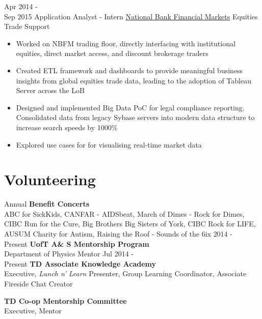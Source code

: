 \documentclass[letterpaper]{twentysecondcv} %
\begin{document}
\begin{twenty}
     \twentyitem
   		{Apr 2014 - \\ Sep 2015}
        {Application Analyst - Intern}
        {\href{http://nbfm.ca/}{National Bank Financial Markets}}
        {Equities Trade Support}
        {
        \begin{itemize}
		\item Worked on NBFM trading floor, directly interfacing with institutional equities, direct market access, and discount brokerage traders
        \item Created ETL framework and  dashboards to provide meaningful business insights from global equities trade data, leading to the adoption of Tableau Server across the LoB
        \item Designed and implemented  Big Data PoC for legal compliance reporting. Consolidated data from legacy Sybase servers into modern data structure to increase search speeds by 1000\% 
        \item Explored use cases for  for visualising real-time market data
	    \end{itemize}
    	}
        
\end{twenty}

\vfill
\section{Volunteering}
\begin{twentyshort}
\twentyitemshort
		{Annual}
		{\textbf{Benefit Concerts} \\ ABC for SickKids, CANFAR - AIDSbeat, March of Dimes - Rock for Dimes, CIBC Run for the Cure, Big Brothers Big Sisters of York, CIBC Rock for LIFE, AUSUM Charity for Autism, Raising the Roof - Sounds of the 6ix}
\twentyitemshort
   		{2014 - \\ Present}
        {\textbf{UofT A\& S Mentorship Program} \\ Department of Physics Mentor}
\twentyitemshort
   		{Jul 2014 - \\ Present}
        {\textbf{TD Associate Knowledge Academy} \\ Executive, \emph{Lunch n' Learn} Presenter, Group Learning Coordinator, Associate Fireside Chat Creator}

\twentyitemshort
   		{}
        {\textbf{TD Co-op Mentorship Committee} \\ Executive, Mentor}
\end{twentyshort}
\end{document}
